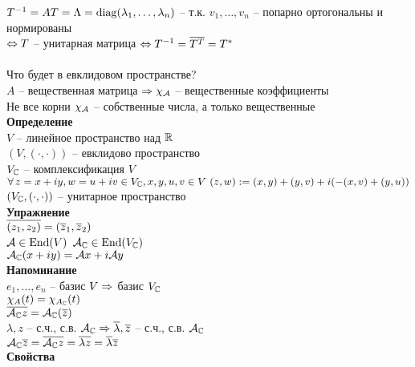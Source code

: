 \documentclass[12pt]{article}
\begin{document}
$T^{-1} = A T = \Lambda = \operatorname{diag}( \lambda_1, \ldots, \lambda_n)$ -- т.к. $v_1, \ldots, v_n$ -- попарно ортогональны и нормированы\\
$\Leftrightarrow T$ -- унитарная матрица $\Leftrightarrow T^{-1} = \overline{T^T} = T^*$\\\\
Что будет в евклидовом пространстве?\\
$A$ -- вещественная матрица $\Rightarrow \chi_\mathcal{A}$ -- вещественные коэффициенты\\
Не все корни $\chi_{\mathcal{A}}$ -- собственные числа, а только вещественные\\
\textbf{Определение}\\
$V$ -- линейное пространство над $\mathbb{R}$\\
$(V, (\cdot, \cdot))$ -- евклидово пространство\\
$V_\mathbb{C}$ -- комплексификация $V$\\
$\forall\, z = x + iy, w=u+iv \in V_\mathbb{C}, x, y, u, v \in V\ (z, w):= (x, y) + (y, v) + i(-(x, v) + (y, u))$\\
$(V_\mathbb{C}, (\cdot, \cdot))$ -- унитарное пространство\\
\textbf{Упражнение}\\
$\overline{(z_1, z_2)} = (\overline z_1, \overline z_2)$\\
$\mathcal{A} \in \operatorname{End}(V)$
$\mathcal{A}_\mathbb{C} \in \operatorname{End}(V_\mathbb{C})$\\
$\mathcal{A}_\mathbb{C} (x+iy) = \mathcal{A} x + i \mathcal{A} y$\\
\textbf{Напоминание}\\
$e_1, \ldots, e_n$ -- базис $V \Rightarrow $ базис $V_\mathbb{C}$\\
$\chi_A(t) = \chi_{A_\mathbb{C}}(t)$\\
$\overline{\mathcal{A}_\mathbb{C} z} = \mathcal{A}_\mathbb{C}(\overline z)$\\
$ \lambda, z$ -- с.ч., с.в. $\mathcal{A}_\mathbb{C} \Rightarrow \overline \lambda, \overline z$ -- с.ч., с.в. $\mathcal{A}_\mathbb{C}$\\
$\mathcal{A}_\mathbb{C} \overline z = \overline{\mathcal{A}_\mathbb{C} z} = \overline{ \lambda z} = \overline \lambda \overline z$\\
\textbf{Свойства}
\end{document}
